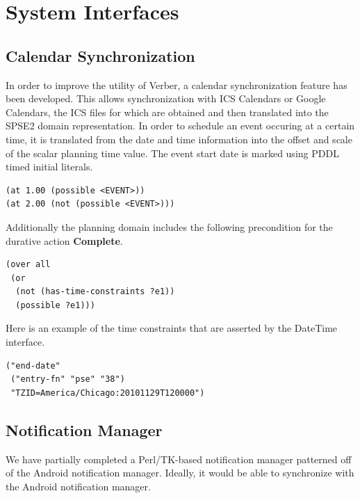 \documentclass[letterpaper]{article}
\begin{document}
\section{System Interfaces}

\subsection{Calendar Synchronization}

In order to improve the utility of Verber, a calendar synchronization
feature has been developed.  This allows synchronization with ICS
Calendars or Google Calendars, the ICS files for which are obtained
and then translated into the SPSE2 domain representation.  In order to
schedule an event occuring at a certain time, it is translated from
the date and time information into the offset and scale of the scalar
planning time value.  The event start date is marked using PDDL timed
initial literals.

\begin{footnotesize}
\begin{verbatim}
(at 1.00 (possible <EVENT>))
(at 2.00 (not (possible <EVENT>)))
\end{verbatim}
\end{footnotesize}

Additionally the planning domain includes the following precondition
for the durative action {\bf Complete}.

\begin{footnotesize}
\begin{verbatim}
(over all
 (or
  (not (has-time-constraints ?e1))
  (possible ?e1)))
\end{verbatim}
\end{footnotesize}

Here is an example of the time constraints that are asserted by the
DateTime interface.

\begin{footnotesize}
\begin{verbatim}
("end-date"
 ("entry-fn" "pse" "38")
 "TZID=America/Chicago:20101129T120000")
\end{verbatim}
\end{footnotesize}

\subsection{Notification Manager}

\noindent We have partially completed a Perl/TK-based notification
manager patterned off of the Android notification manager.  Ideally,
it would be able to synchronize with the Android notification manager.
\end{document}
